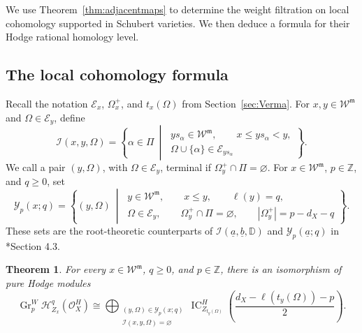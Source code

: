 \documentclass[12pt]{amsart}
\renewcommand{\a}{\underline{a}}
\renewcommand{\b}{\underline{b}}
\newcommand{\mc}[1]{\mathcal{#1}}
\newcommand{\defi}[1]{{\upshape\sffamily #1}}
\newtheorem{theorem}{Theorem}[section]
\theoremstyle{definition}
\numberwithin{equation}{section}
\newcommand{\m}{\mathfrak m}
\newcommand{\W}{\mathscr W}
\begin{document}
We use Theorem~\ref{thm:adjacentmaps} to determine the weight
filtration on local cohomology supported in Schubert varieties.
We then deduce a formula for their Hodge rational homology level.

\subsection{The local cohomology formula}
Recall the notation $\mathscr E_x$, $\Omega_x^+$, and
$t_x(\Omega)$ from Section~\ref{sec:Verma}.
For $x,y\in\W^{\m}$ and $\Omega\in\mathscr E_y$, define
\begin{equation}\label{eq:lc-directions}
\mathscr I(x,y,\Omega)
=\left\{\alpha\in\Pi\ \middle|\
\begin{gathered}
ys_\alpha\in\W^{\m},\qquad x\leq ys_\alpha<y,\\
\Omega\cup\{\alpha\}\in\mathscr E_{ys_\alpha}
\end{gathered}\right\}.
\end{equation}
We call a pair $(y,\Omega)$, with $\Omega\in\mathscr E_y$,
\defi{terminal} if $\Omega_y^+\cap\Pi=\varnothing$.
For $x\in\W^{\m}$, $p\in\mathbb Z$, and $q\geq0$, set
\begin{equation}\label{eq:lc-terminal-pairs}
\mathscr Y_p(x;q)
=\left\{(y,\Omega)\ \middle|\
\begin{gathered}
y\in\W^{\m},\qquad x\leq y,\qquad \ell(y)=q,\\
\Omega\in\mathscr E_y,\qquad
\Omega_y^+\cap\Pi=\varnothing,\qquad
|\Omega_y^+|=p-d_X-q
\end{gathered}\right\}.
\end{equation}
These sets are the root-theoretic counterparts of
$\mc I(\a,\b,\mathbb D)$ and $\mc Y_p(\a;q)$
in \cite{schubertLC}*{Section 4.3}.

\begin{theorem}\label{thm:local-cohomology}
For every $x\in\W^{\m}$, $q\geq0$, and $p\in\mathbb Z$,
there is an isomorphism of pure Hodge modules
\begin{equation}\label{eq:lc-main-formula}
\operatorname{Gr}^W_p
\mathscr H^q_{Z_x}(\mathscr O_X^H)
\cong
\bigoplus_{\substack{
(y,\Omega)\in\mathscr Y_p(x;q)\\
\mathscr I(x,y,\Omega)=\varnothing
}}
\operatorname{IC}_{Z_{t_y(\Omega)}}^H
\left(\frac{d_X-\ell(t_y(\Omega))-p}{2}\right).
\end{equation}
\end{theorem}
\end{document}
